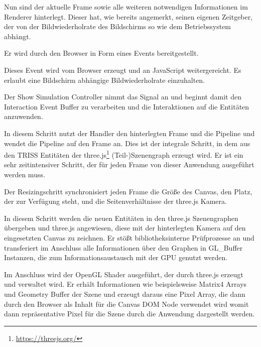 Nun sind der aktuelle Frame sowie alle weiteren notwendigen Informationen im Renderer hinterlegt.
Dieser hat, wie bereits angemerkt, seinen eigenen Zeitgeber, der von der Bildwiederholrate des Bildschirms so wie dem Betriebssystem abhängt.

Er wird durch den Browser in Form eines Events bereitgestellt.

\begin{itemize}
     Dieses Event wird vom Browser erzeugt und an JavaScript weitergereicht. Es erlaubt eine Bildschirm abhängige Bildwiederholrate einzuhalten.

     Der Show Simulation Controller nimmt das Signal an und beginnt damit den Interaction Event Buffer zu verarbeiten und die Interaktionen auf die Entitäten anzuwenden.

     In diesem Schritt nutzt der Handler den hinterlegten Frame und die Pipeline und wendet die Pipeline auf den Frame an.
    Dies ist der integrale Schritt, in dem aus den TRISS Entitäten der three.js\footnote{\url{https://threejs.org/}} (Teil-)Szenengraph erzeugt wird.
    Er ist ein sehr zeitintensiver Schritt, der für jeden Frame von dieser Anwendung ausgeführt werden muss.

     Der Resizingschritt synchronisiert jeden Frame die Größe des Canvas, den Platz, der zur Verfügung steht, und die Seitenverhältnisse der three.js Kamera.

     In diesem Schritt werden die neuen Entitäten in den three.js Szenengraphen übergeben und three.js angewiesen, diese mit der hinterlegten Kamera auf den eingesetzten Canvas zu zeichnen.
    Er stößt bibliotheksinterne Prüfprozesse an und transferiert im Anschluss alle Informationen über den Graphen in GL\_Buffer Instanzen, die zum Informationsaustausch mit der GPU genutzt werden.

     Im Anschluss wird der OpenGL Shader ausgeführt, der durch three.js erzeugt und verwaltet wird.
    Er erhält Informationen wie beispielsweise Matrix4 Arrays und Geometry Buffer der Szene und erzeugt daraus eine Pixel Array, die dann durch den Browser als Inhalt für die Canvas DOM Node verwendet wird womit dann repräsentative Pixel für die Szene durch die Anwendung dargestellt werden.


\end{itemize}
